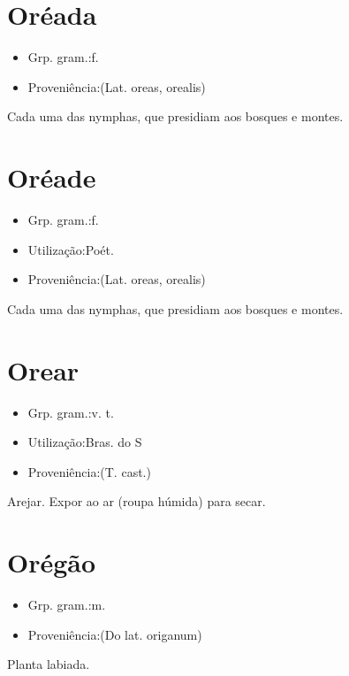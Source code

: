\section{Oréada}
\begin{itemize}
\item {Grp. gram.:f.}
\end{itemize}
\begin{itemize}
\item {Proveniência:(Lat. \textunderscore oreas\textunderscore , \textunderscore orealis\textunderscore )}
\end{itemize}
Cada uma das nymphas, que presidiam aos bosques e montes.
\section{Oréade}
\begin{itemize}
\item {Grp. gram.:f.}
\end{itemize}
\begin{itemize}
\item {Utilização:Poét.}
\end{itemize}
\begin{itemize}
\item {Proveniência:(Lat. \textunderscore oreas\textunderscore , \textunderscore orealis\textunderscore )}
\end{itemize}
Cada uma das nymphas, que presidiam aos bosques e montes.
\section{Orear}
\begin{itemize}
\item {Grp. gram.:v. t.}
\end{itemize}
\begin{itemize}
\item {Utilização:Bras. do S}
\end{itemize}
\begin{itemize}
\item {Proveniência:(T. cast.)}
\end{itemize}
Arejar.
Expor ao ar (roupa húmida) para secar.
\section{Orégão}
\begin{itemize}
\item {Grp. gram.:m.}
\end{itemize}
\begin{itemize}
\item {Proveniência:(Do lat. \textunderscore origanum\textunderscore )}
\end{itemize}
Planta labiada.
